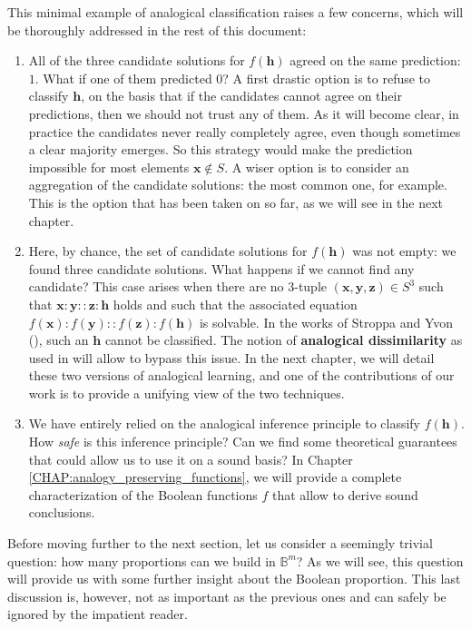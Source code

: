 This minimal example of analogical classification raises a few concerns, which
will be thoroughly addressed in the rest of this document:
\begin{enumerate}
  \item All of the three candidate solutions for $f(\mathbf{h})$ agreed on the
    same prediction: $1$. What if one of them predicted $0$? A first drastic
    option is to refuse to classify $\mathbf{h}$, on the basis that if the
    candidates cannot agree on their predictions, then we should not trust any
    of them. As it will become clear, in practice the candidates never really
    completely agree, even though sometimes a clear majority emerges. So this
    strategy would make the prediction impossible for most elements $\mathbf{x}
    \notin S$. A wiser option is to consider an aggregation of the candidate
    solutions: the most common one, for example. This is the option that has
    been taken on so far, as we will see in the next chapter.
  \item Here, by chance, the set of candidate solutions for $f(\mathbf{h})$ was
    not empty: we found three candidate solutions. What happens if we cannot
    find any candidate? This case arises when there are no 3-tuple
    $(\mathbf{x}, \mathbf{y}, \mathbf{z}) \in S^3$ such that $\mathbf{x} :
    \mathbf{y}::\mathbf{z}:\mathbf{h}$ holds and such that the associated equation
    $f(\mathbf{x}):f(\mathbf{y})::f(\mathbf{z}):f(\mathbf{h})$ is solvable. In
    the works of Stroppa and Yvon (\cite{StrYvoCNLL05}), such an $\mathbf{h}$
    cannot be classified. The notion of \textbf{analogical dissimilarity} as
    used in \cite{BayMicDelIJCAI07} will allow to bypass this issue. In the
    next chapter, we will detail these two versions of analogical learning, and
    one of the contributions of our work is to provide a unifying view of the
    two techniques.
  \item We have entirely relied on the analogical inference principle to
    classify $f(\mathbf{h})$. How \textit{safe} is this inference principle?
    Can we find some theoretical guarantees that could allow us to use it on a
    sound basis? In Chapter \ref{CHAP:analogy_preserving_functions}, we
    will provide a complete characterization of the Boolean functions $f$ that
    allow to derive sound conclusions.\\
\end{enumerate}

\noindent
Before moving further to the next section, let us  consider a seemingly trivial
question: how many proportions can we build in $\mathbb{B}^m$? As we will see,
this question will provide us with some further insight about the Boolean proportion.
This last discussion is, however, not as important as the previous ones and can
safely be ignored by the impatient reader.

